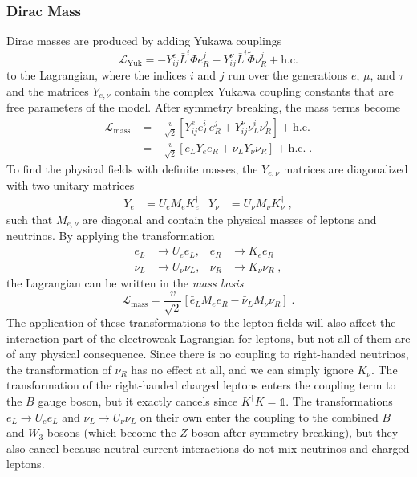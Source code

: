 \subsubsection{Dirac Mass}

Dirac masses are produced by adding Yukawa couplings
\begin{equation}
    \mathcal{L}_\mathrm{Yuk} = -Y_{ij}^e \bar{L}^i \Phi e_R^j - Y_{ij}^\nu \bar{L}^i \tilde{\Phi} \nu_R^j + \mathrm{h.c.}\label{eq:yukawa-coupling}
\end{equation}
to the Lagrangian, where the indices $i$ and $j$ run over the generations $e$, $\mu$, and $\tau$ and the matrices $Y_{e,\nu}$ contain the complex Yukawa coupling constants that are free parameters of the model.
After symmetry breaking, the mass terms become
\begin{equation}
\begin{aligned}
  \mathcal{L}_\mathrm{mass} &= -\frac{v}{\sqrt{2}}\left[  Y^e_{ij} \bar{e}_L^i e_R^j +  Y^\nu_{ij} \bar{\nu}_L^i \nu_R^j \right] + \mathrm{h.c.} \\
  &=  -\frac{v}{\sqrt{2}}\left[ \bar{e}_L Y_e e_R + \bar{\nu}_L Y_\nu \nu_R \right] + \mathrm{h.c.}\;.
\end{aligned}
\end{equation}
To find the physical fields with definite masses, the $Y_{e,\nu}$ matrices are diagonalized with two unitary matrices
\begin{align}
    Y_e &= U_e M_e K_e^\dag &Y_\nu &= U_\nu M_\nu K_\nu^\dag\;,
\end{align}
such that $M_{e,\nu}$ are diagonal and contain the physical masses of leptons and neutrinos.
By applying the transformation
\begin{equation}
\begin{aligned}
    e_L &\rightarrow U_e e_L, &e_R &\rightarrow K_e e_R \\
    \nu_L &\rightarrow U_\nu \nu_L, &\nu_R &\rightarrow K_\nu \nu_R\;, \label{eq:mass-basis-trafo}
\end{aligned}
\end{equation}
the Lagrangian can be written in the \emph{mass basis}
\begin{equation}
    \mathcal{L}_\mathrm{mass} = \frac{v}{\sqrt{2}} \left[ \bar{e}_L M_e e_R - \bar{\nu}_L M_\nu \nu_R \right]\;.\label{eq:mass-lagrangian-diagonal}
\end{equation}
The application of these transformations to the lepton fields will also affect the interaction part of the electroweak Lagrangian for leptons, but not all of them are of any physical consequence. Since there is no coupling to right-handed neutrinos, the transformation of $\nu_R$ has no effect at all, and we can simply ignore $K_\nu$. The transformation of the right-handed charged leptons enters the coupling term to the $B$ gauge boson, but it exactly cancels since $K^\dag K = \mathbb{1}$. The transformations $e_L \rightarrow U_e e_L$ and $\nu_L \rightarrow U_\nu \nu_L$ on their own enter the coupling to the combined $B$ and $W_3$ bosons (which become the $Z$ boson after symmetry breaking), but they also cancel because neutral-current interactions do not mix neutrinos and charged leptons.
